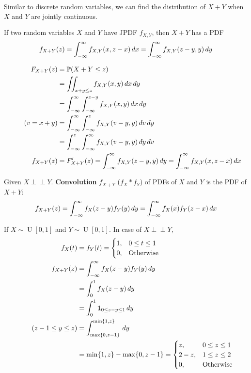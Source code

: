\documentclass{huhtakm-template-book}
\newcommand{\independent}{\perp\!\!\!\perp}
\newcommand{\prob}{\mathbb{P}}
\DeclareMathOperator{\U}{U}
\begin{document}
    Similar to discrete random variables, we can find the distribution of $X+Y$ when $X$ and $Y$ are jointly continuous.
    \begin{thm}
        If two random variables $X$ and $Y$ have JPDF $f_{X,Y}$, then $X+Y$ has a PDF
        \begin{equation*}
            f_{X+Y}(z)=\int_{-\infty}^{\infty} f_{X,Y}(x,z-x)\,dx=\int_{-\infty}^{\infty} f_{X,Y}(z-y,y)\,dy
        \end{equation*}
    \end{thm}
    
    \newpage
    \begin{proofing}
        \begin{align*}
            F_{X+Y}(z)&=\prob(X+Y\leq z)\\
            &=\iint_{x+y\leq z}f_{X,Y}(x,y)\,dx\,dy\\
            &=\intinfty\intlu{-\infty}{z-y}f_{X,Y}(x,y)\,dx\,dy\\
            \tag{$v=x+y$}
            &=\intinfty\intlu{-\infty}{z}f_{X,Y}(v-y,y)\,dv\,dy\\
            &=\intlu{-\infty}{z}\intinfty f_{X,Y}(v-y,y)\,dy\,dv\\
            f_{X+Y}(z)&=F_{X+Y}'(z)=\intinfty f_{X,Y}(z-y,y)\,dy=\intinfty f_{X,Y}(x,z-x)\,dx
        \end{align*}
    \end{proofing}
    \begin{defn}
        Given $X\independent Y$. \textbf{Convolution} $f_{X+Y}$ ($f_{X}*f_{Y}$) of PDFs of $X$ and $Y$ is the PDF of $X+Y$:
        \begin{equation*}
            f_{X+Y}(z)=\int_{-\infty}^{\infty} f_{X}(z-y)f_{Y}(y)\,dy=\int_{-\infty}^{\infty} f_{X}(x)f_{Y}(z-x)\,dx
        \end{equation*}
    \end{defn}
    \begin{eg}
        If $X\sim\U[0,1]$ and $Y\sim\U[0,1]$. In case of $X\independent Y$,
        \begin{align*}
            f_{X}(t)&=f_{Y}(t)=\begin{cases}
                1, &0\leq t\leq 1\\
                0, &\text{Otherwise}
            \end{cases}\\
            f_{X+Y}(z)&=\int_{-\infty}^{\infty} f_{X}(z-y)f_{Y}(y)\,dy\\
            &=\int_{0}^{1}f_{X}(z-y)\,dy\\
            &=\int_{0}^{1}\mathbf{1}_{0\leq z-y\leq 1}\,dy\\
            \tag{$z-1\leq y\leq z$}
            &=\int_{\max\{0,z-1\}}^{\min\{1,z\}}\,dy\\
            &=\min\{1,z\}-\max\{0,z-1\}=\begin{cases}
                z, &0\leq z\leq 1\\
                2-z, &1\leq z\leq 2\\
                0, &\text{Otherwise}
            \end{cases}
        \end{align*}
    \end{eg}
\end{document}
